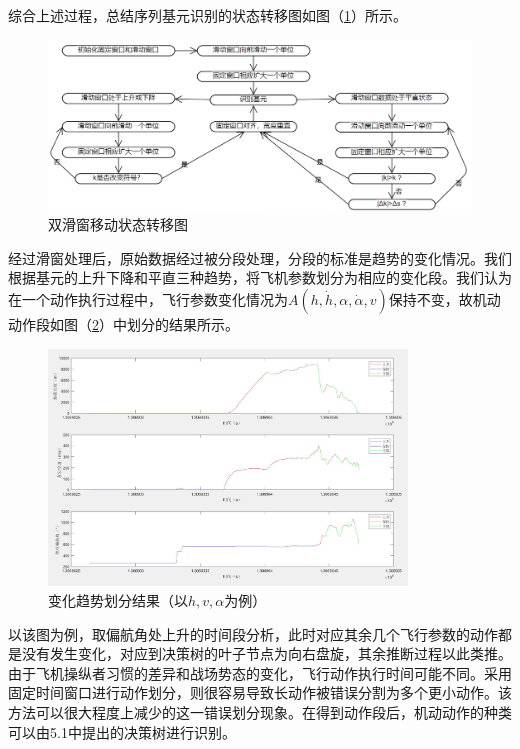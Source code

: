 \documentclass{my_paper}
\begin{document}
综合上述过程，总结序列基元识别的状态转移图如图（\ref{slide}）所示。

\begin {figure}[h]
\centering %
\includegraphics[width=\textwidth]{slide.png}
\caption{双滑窗移动状态转移图} %
\label{slide}
\end {figure}

\newpage 
经过滑窗处理后，原始数据经过被分段处理，分段的标准是趋势的变化情况。我们根据基元的上升下降和平直三种趋势，将飞机参数划分为相应的变化段。我们认为在一个动作执行过程中，飞行参数变化情况为$A(h,\dot{h},\alpha,\dot{\alpha},v )$保持不变，故机动动作段如图（\ref{huafen}）中划分的结果所示。
\begin {figure}[h]
\centering %
\includegraphics[width=0.85\textwidth]{d.jpg}
\caption{变化趋势划分结果（以$h,v,\alpha$为例）} %
\label{huafen}
\end {figure}

以该图为例，取偏航角处上升的时间段分析，此时对应其余几个飞行参数的动作都是没有发生变化，对应到决策树的叶子节点为向右盘旋，其余推断过程以此类推。由于飞机操纵者习惯的差异和战场势态的变化，飞行动作执行时间可能不同。采用固定时间窗口进行动作划分，则很容易导致长动作被错误分割为多个更小动作。该方法可以很大程度上减少的这一错误划分现象。在得到动作段后，机动动作的种类可以由5.1中提出的决策树进行识别。
\end{document}
